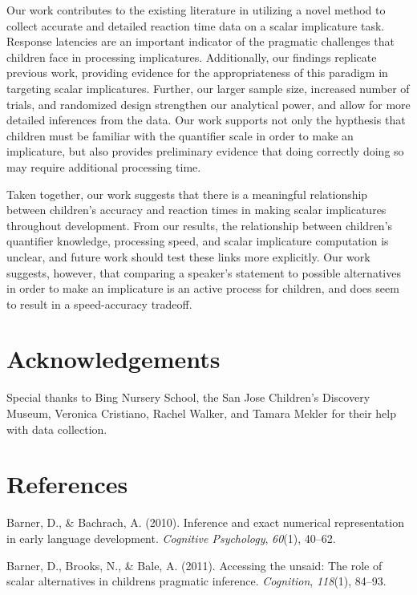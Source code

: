 \documentclass[10pt, letterpaper]{article}
\begin{document}
Our work contributes to the existing literature in utilizing a novel
method to collect accurate and detailed reaction time data on a scalar
implicature task. Response latencies are an important indicator of the
pragmatic challenges that children face in processing implicatures.
Additionally, our findings replicate previous work, providing evidence
for the appropriateness of this paradigm in targeting scalar
implicatures. Further, our larger sample size, increased number of
trials, and randomized design strengthen our analytical power, and allow
for more detailed inferences from the data. Our work supports not only
the hypthesis that children must be familiar with the quantifier scale
in order to make an implicature, but also provides preliminary evidence
that doing correctly doing so may require additional processing time.

Taken together, our work suggests that there is a meaningful
relationship between children's accuracy and reaction times in making
scalar implicatures throughout development. From our results, the
relationship between children's quantifier knowledge, processing speed,
and scalar implicature computation is unclear, and future work should
test these links more explicitly. Our work suggests, however, that
comparing a speaker's statement to possible alternatives in order to
make an implicature is an active process for children, and does seem to
result in a speed-accuracy tradeoff.

\section{Acknowledgements}\label{acknowledgements}

Special thanks to Bing Nursery School, the San Jose Children's Discovery
Museum, Veronica Cristiano, Rachel Walker, and Tamara Mekler for their
help with data collection.

\section{References}\label{references}

\setlength{\parindent}{-0.1in} \setlength{\leftskip}{0.125in} \noindent

Barner, D., \& Bachrach, A. (2010). Inference and exact numerical
representation in early language development. \emph{Cognitive
Psychology}, \emph{60}(1), 40--62.

Barner, D., Brooks, N., \& Bale, A. (2011). Accessing the unsaid: The
role of scalar alternatives in childrens pragmatic inference.
\emph{Cognition}, \emph{118}(1), 84--93.
\end{document}
